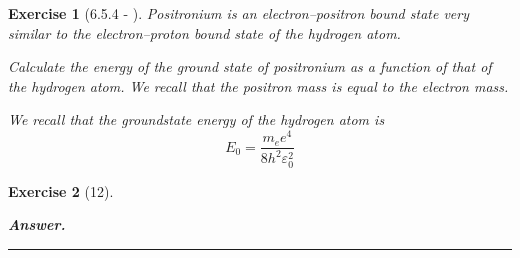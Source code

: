 \documentclass[12pt]{article}
\def\be{\begin{equation}}
\def\ee{\end{equation}}
\def\f{\frac}
\newtheorem{exercise}{Exercise}
\newenvironment{answer}{\noindent\textbf{\textit{Answer.}} \normalfont }{\par\noindent\rule{\textwidth}{0.4pt}}
\begin{document}
	\begin{exercise}[6.5.4 - ]
		Positronium is an electron–positron bound state very similar to the electron–proton bound state of the hydrogen atom.
		\begin{exercises}
			\item Calculate the energy of the ground state of positronium as a function of that of the hydrogen atom. We recall that the positron mass is equal to the electron mass.
			\begin{multianswer}
				We recall that the groundstate energy of the hydrogen atom is
				\be
					E_0 = \f{m_ee^4}{8h^2\varepsilon_0^2}
				\ee
			\end{multianswer}
			
			
		\end{exercises}
	\end{exercise}
	
	\begin{exercise}[12]
		
	\end{exercise}
	\begin{answer}
		
	\end{answer}
\end{document}
